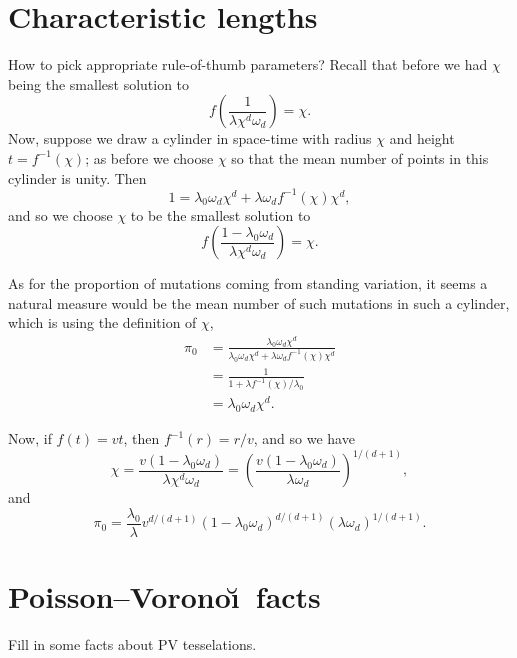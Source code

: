 \documentclass{article}
\begin{document}
\section{Characteristic lengths}

How to pick appropriate rule-of-thumb parameters?
Recall that before we had $\chi$ being the smallest solution to
\[
    f\left( \frac{1}{\lambda \chi^d \omega_d} \right) = \chi.
\]
Now, suppose we draw a cylinder in space-time with radius $\chi$ and height $t=f^{-1}(\chi)$;
as before we choose $\chi$ so that the mean number of points in this cylinder is unity.
Then
\[
    1 = \lambda_0 \omega_d \chi^d + \lambda \omega_d f^{-1}(\chi) \chi^d ,
\]
and so we choose $\chi$ to be the smallest solution to
\[
    f\left( \frac{1 - \lambda_0 \omega_d}{\lambda \chi^d \omega_d} \right) = \chi.
\]

As for the proportion of mutations coming from standing variation,
it seems a natural measure would be the mean number of such mutations in such a cylinder,
which is using the definition of $\chi$,
\begin{align*}
    \pi_0 &= \frac{\lambda_0 \omega_d \chi^d }{ \lambda_0 \omega_d \chi^d + \lambda \omega_d f^{-1}(\chi) \chi^d} \\
        & = \frac{ 1 }{ 1 + \lambda f^{-1}(\chi) / \lambda_0 } \\
        &= \lambda_0 \omega_d \chi^d .
\end{align*}

Now, if $f(t) = vt$, then $f^{-1}(r) = r/v$,
and so we have
\[
    \chi = \frac{ v (1-\lambda_0 \omega_d) }{ \lambda \chi^d \omega_d } = \left( \frac{ v(1-\lambda_0 \omega_d) }{ \lambda \omega_d } \right)^{1/(d+1)} ,
\]
and 
\[
    \pi_0 = \frac{\lambda_0}{\lambda} v^{d/(d+1)} (1-\lambda_0 \omega_d)^{d/(d+1)} (\lambda \omega_d)^{1/(d+1)} .
\]



\section{Poisson--Vorono\u\i\ facts}

Fill in some facts about PV tesselations.
\end{document}
